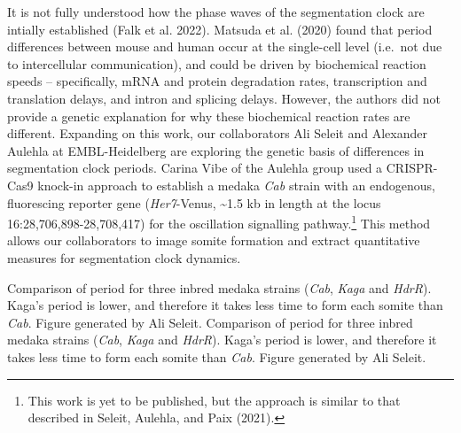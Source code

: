 \documentclass[
]{book}
\begin{document}
It is not fully understood how the phase waves of the segmentation clock are intially established (Falk et al. 2022). Matsuda et al. (2020) found that period differences between mouse and human occur at the single-cell level (i.e.~not due to intercellular communication), and could be driven by biochemical reaction speeds -- specifically, mRNA and protein degradation rates, transcription and translation delays, and intron and splicing delays. However, the authors did not provide a genetic explanation for why these biochemical reaction rates are different. Expanding on this work, our collaborators Ali Seleit and Alexander Aulehla at EMBL-Heidelberg are exploring the genetic basis of differences in segmentation clock periods. Carina Vibe of the Aulehla group used a CRISPR-Cas9 knock-in approach to establish a medaka \emph{Cab} strain with an endogenous, fluorescing reporter gene (\emph{Her7}-Venus, \textasciitilde1.5 kb in length at the locus 16:28,706,898-28,708,417) for the oscillation signalling pathway.\footnote{This work is yet to be published, but the approach is similar to that described in Seleit, Aulehla, and Paix (2021).} This method allows our collaborators to image somite formation and extract quantitative measures for segmentation clock dynamics.

Comparison of period for three inbred medaka strains (\emph{Cab}, \emph{Kaga} and \emph{HdrR}). Kaga's period is lower, and therefore it takes less time to form each somite than \emph{Cab}. Figure generated by Ali Seleit. Comparison of period for three inbred medaka strains (\emph{Cab}, \emph{Kaga} and \emph{HdrR}). Kaga's period is lower, and therefore it takes less time to form each somite than \emph{Cab}. Figure generated by Ali Seleit.
\end{document}
